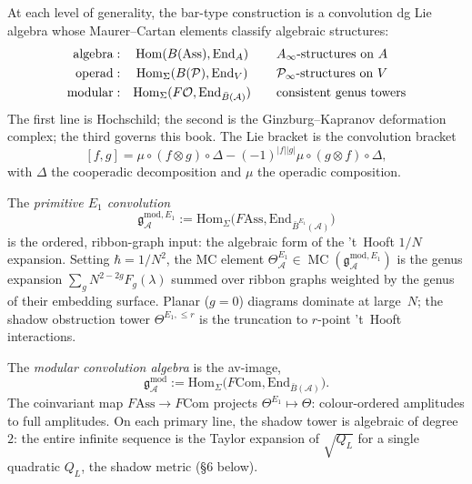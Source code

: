 \documentclass[11pt,reqno]{amsart}
\theoremstyle{definition}
\theoremstyle{remark}
\providecommand{\cA}{\mathcal{A}}
\providecommand{\cO}{\mathcal{O}}
\providecommand{\cP}{\mathcal{P}}
\providecommand{\barB}{\bar{B}}
\providecommand{\Hom}{\mathrm{Hom}}
\providecommand{\gAmod}{\mathfrak{g}^{\mathrm{mod}}_\cA}
\providecommand{\Ass}{\mathrm{Ass}}
\providecommand{\Com}{\mathrm{Com}}
\providecommand{\End}{\mathrm{End}}
\numberwithin{equation}{section}
\begin{document}
At each level of generality, the bar-type construction is a
convolution dg Lie algebra whose Maurer--Cartan elements classify
algebraic structures:
\begin{equation}\label{eq:preface-convolution-ladder}
\begin{array}{r@{\;:\quad}c@{\qquad}l}
\text{algebra} & \Hom(B(\Ass),\End_A) & A_\infty\text{-structures on }A\\[3pt]
\text{operad} & \Hom_\Sigma(B(\cP),\End_V) & \cP_\infty\text{-structures on }V\\[3pt]
\text{modular} & \Hom_\Sigma(F\cO,\End_{\barB(\cA)}) & \text{consistent genus towers}
\end{array}
\end{equation}
The first line is Hochschild; the second is the Ginzburg--Kapranov
deformation complex; the third governs this book. The Lie bracket is
the convolution bracket
\[
[f,g]=\mu\circ(f\otimes g)\circ\Delta-(-1)^{|f||g|}\mu\circ(g\otimes f)\circ\Delta,
\]
with $\Delta$ the cooperadic decomposition and $\mu$ the operadic
composition.

The \emph{primitive $E_1$ convolution}
\[
\mathfrak g^{\mathrm{mod},E_1}_\cA:=\Hom_\Sigma\bigl(F\!\Ass,\End_{\barB^{E_1}(\cA)}\bigr)
\]
is the ordered, ribbon-graph input: the algebraic form of the 't~Hooft
$1/N$ expansion. Setting $\hbar=1/N^2$, the MC element
$\Theta^{E_1}_\cA\in\operatorname{MC}(\mathfrak g^{\mathrm{mod},E_1}_\cA)$
is the genus expansion $\sum_g N^{2-2g}F_g(\lambda)$ summed over
ribbon graphs weighted by the genus of their embedding surface.
Planar ($g=0$) diagrams dominate at large~$N$; the shadow obstruction
tower $\Theta^{E_1,\le r}$ is the truncation to $r$-point 't~Hooft
interactions.

The \emph{modular convolution algebra} is the av-image,
\begin{equation}\label{eq:preface-gmod}
\gAmod:=\Hom_\Sigma\bigl(F\Com,\End_{\barB(\cA)}\bigr).
\end{equation}
The coinvariant map $F\!\Ass\to F\Com$ projects
$\Theta^{E_1}\mapsto\Theta$: colour-ordered amplitudes to full
amplitudes. On each primary line, the shadow tower is algebraic of
degree~$2$: the entire infinite sequence is the Taylor expansion of
$\sqrt{Q_L}$ for a single quadratic $Q_L$, the shadow metric
(\S6 below).
\end{document}
